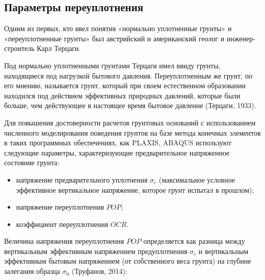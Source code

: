 %
%
%

\subsection{Параметры переуплотнения}

Одним из первых, кто ввел понятия «нормально уплотненные грунты»
и «переуплотненные грунты» был австрийский и американский геолог и инженер-
строитель Карл Терцаги.

Под нормально уплотненными грунтами Терцаги имел ввиду грунты, находящиеся
под нагрузкой бытового давления. Переуплотненным же грунт, по
его мнению, называется грунт, который при своем естественном образовании
находился под действием эффективных природных давлений, которые были
больше, чем действующее в настоящее время бытовое давление (Терцаги, 1933).

Для повышения достоверности расчетов грунтовых оснований 
с использованием численного моделирования поведения 
грунтов на базе метода конечных элементов в таких программных
обеспечениях, как PLAXIS, ABAQUS используют следующие 
параметры, характеризующие предварительное напряженное 
состояние грунта:

\begin{itemize}
\item напряжение предварительного уплотнения $\sigma_c$ 
(максимальное условное эффективное вертикальное напряжение, 
которое грунт испытал в прошлом);

\item напряжение переуплотнения $POP$;

\item коэффициент переуплотнения $OCR$.
\end{itemize}

Величина напряжения переуплотнения $POP$ определяется 
как разница между вертикальным эффективным напряжением 
предуплотнения $\sigma_c$ и вертикальным эффективным бытовым напряжением 
(от собственного веса грунта) на глубине залегания образца $\sigma_0$ (Труфанов, 2014):

